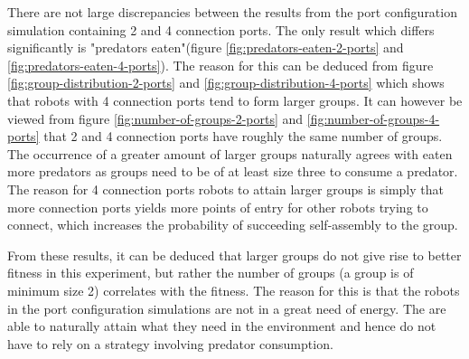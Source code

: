 There are not large discrepancies between the results from the port configuration simulation containing 2 and 4 connection ports.
The only result which differs significantly is "predators eaten"(figure \ref{fig:predators-eaten-2-ports} and \ref{fig:predators-eaten-4-ports}).
The reason for this can be deduced from figure \ref{fig:group-distribution-2-ports} and \ref{fig:group-distribution-4-ports} which shows that robots with 4 connection ports tend to form larger groups.
It can however be viewed from figure \ref{fig:number-of-groups-2-ports} and \ref{fig:number-of-groups-4-ports} that 2 and 4 connection ports have roughly the same number of groups.
The occurrence of a greater amount of larger groups naturally agrees with eaten more predators as groups need to be of at least size three to consume a predator.
The reason for 4 connection ports robots to attain larger groups is simply that more connection ports yields more points of entry for other robots trying to connect, which increases the probability of succeeding self-assembly to the group.

From these results, it can be deduced that larger groups do not give rise to better fitness in this experiment, but rather the number of groups (a group is of minimum size 2) correlates with the fitness.
The reason for this is that the robots in the port configuration simulations are not in a great need of energy.
The are able to naturally attain what they need in the environment and hence do not have to rely on a strategy involving predator consumption.

























